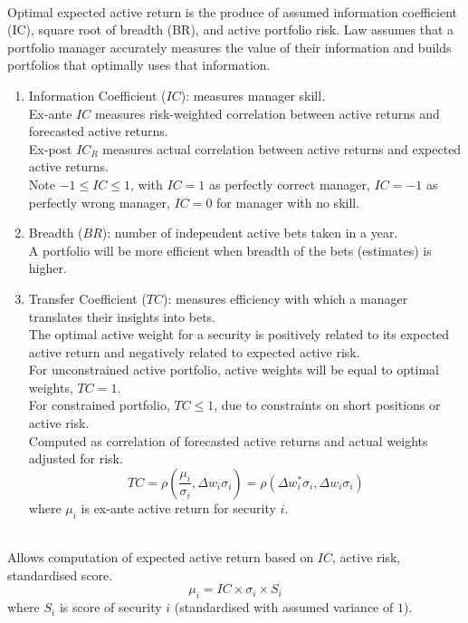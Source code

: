 \begin{remark} \\
Optimal expected active return is the produce of assumed information coefficient (IC), square root of breadth (BR), and active portfolio risk. Law assumes that a portfolio manager accurately measures the value of their information and builds portfolios that optimally uses that information.
\begin{enumerate}[label=\roman*.]
\setlength{\itemsep}{0pt}
\item Information Coefficient ($IC$): measures manager skill.\\
Ex-ante $IC$ measures risk-weighted correlation between active returns and forecasted active returns.\\
Ex-post $IC_R$ measures actual correlation between active returns and expected active returns.\\
Note $-1 \leq IC \leq 1$, with $IC = 1$ as perfectly correct manager, $IC = -1$ as perfectly wrong manager, $IC = 0$ for manager with no skill.
\item Breadth ($BR$): number of independent active bets taken in a year.\\
A portfolio will be more efficient when breadth of the bets (estimates) is higher. 
\item Transfer Coefficient ($TC$): measures efficiency with which a manager translates their insights into bets.\\
The optimal active weight for a security is positively related to its expected active return and negatively related to expected active risk. \\
For unconstrained active portfolio, active weights will be equal to optimal weights, $TC = 1$.\\
For constrained portfolio, $TC \leq 1$, due to constraints on short positions or active risk.\\
Computed as correlation of forecasted active returns and actual weights adjusted for risk.
\begin{equation}
TC = \rho \left(\frac{\mu_i}{\sigma_i}, \Delta w_i \sigma_i \right) = \rho (\Delta w_i^{*} \sigma_i, \Delta w_i \sigma_i) \nonumber
\end{equation}
where $\mu_i$ is ex-ante active return for security $i$.
\end{enumerate}
\end{remark}

\begin{definition} \\
Allows computation of expected active return based on $IC$, active risk, standardised score.
\begin{equation}
\mu_i = IC \times \sigma_i \times S_i \nonumber
\end{equation}
where $S_i$ is score of security $i$ (standardised with assumed variance of $1$).
\end{definition}

